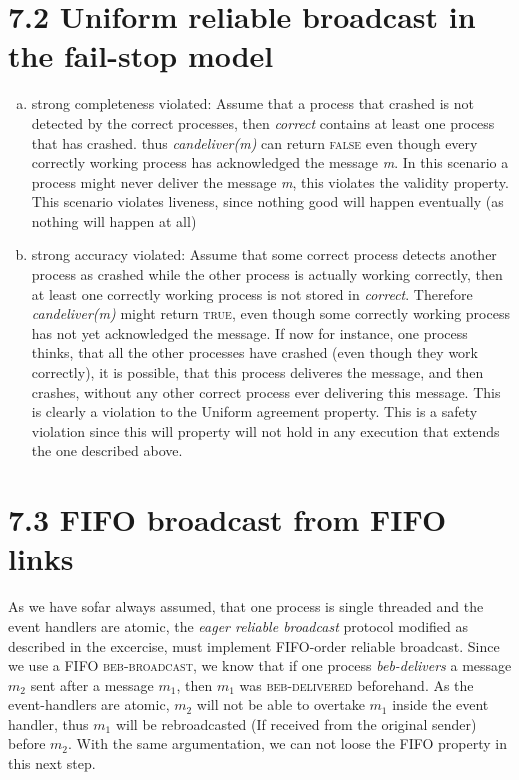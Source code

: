 \documentclass{article}
\begin{document}
    \section*{7.2 Uniform reliable broadcast in the fail-stop model}
    \begin{enumerate}[a)]
        \item strong completeness violated: Assume that a process that crashed is not detected by the correct processes,
        then \textit{correct} contains at least one process that has crashed.
        thus \textit{candeliver(m)} can return \textsc{false} even though every correctly working process has acknowledged the message \textit{m}.
        In this scenario a process might never deliver the message \textit{m}, this violates the validity property. This scenario violates liveness, since nothing good will happen eventually (as nothing will happen at all)
        
        \item strong accuracy violated: Assume that some correct process detects another process as crashed while the other process is actually working correctly,
        then at least one correctly working process is not stored in \textit{correct}.
        Therefore \textit{candeliver(m)} might return \textsc{true}, even though some correctly working process has not yet acknowledged the message.
        If now for instance, one process thinks, that all the other processes have crashed (even though they work correctly), it is possible, that this process deliveres the message, and then crashes, without any other correct process ever delivering this message.
        This is clearly a violation to the Uniform agreement property. This is a safety violation since this will property will not hold in any execution that extends the one described above.
    \end{enumerate}
    \section*{7.3 FIFO broadcast from FIFO links}
    As we have sofar always assumed, that one process is single threaded and the event handlers are atomic, the \textit{eager reliable broadcast} protocol modified as described in the excercise,
    must implement FIFO-order reliable broadcast.
    Since we use a FIFO \textsc{beb-broadcast}, we know that if one process \textit{beb-delivers} a message $m_2$ sent after a message $m_1$, then $m_1$ was \textsc{beb-delivered} beforehand.
    As the event-handlers are atomic, $m_2$ will not be able to overtake $m_1$ inside the event handler, thus $m_1$ will be rebroadcasted (If received from the original sender) before $m_2$.
    With the same argumentation, we can not loose the FIFO property in this next step. 
\end{document}
